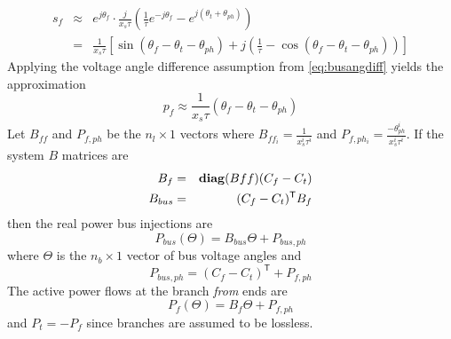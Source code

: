 \begin{eqnarray}
s_f& \approx& e^{j\theta_f} \cdot \frac{j}{x_s\tau}
(\frac{1}{\tau}e^{-j\theta_f} - e^{j(\theta_t + \theta_{ph})})\\
& =& \frac{1}{x_s\tau} \left[ \sin(\theta_f-\theta_t-\theta_{ph}) +
j\left( \frac{1}{\tau} - \cos(\theta_f-\theta_t-\theta_{ph}) \right) \right]
\end{eqnarray}
Applying the voltage angle difference assumption from \ref{eq:busangdiff} yields
the approximation
\begin{equation}
p_f \approx \frac{1}{x_s\tau}(\theta_f-\theta_t-\theta_{ph})
\end{equation}
Let $B_{ff}$ and $P_{f,ph}$ be the $n_l \times 1$ vectors where
$B_{ff_i} = \frac{1}{x_s^i\tau^i}$ and $P_{f,ph_i} =
\frac{-\theta_{ph}^i}{x_s^i\tau^i}$.  If the system $B$ matrices are
\begin{eqnarray}
B_f& =& \mathop{\mathbf{diag}}(Bff)(C_f-C_t)\\
B_{bus}& = &(C_f-C_t)^\mathsf{T}B_f
\end{eqnarray}
then the real power bus injections are
\begin{equation}
\label{eq:bbus}
P_{bus}(\Theta) = B_{bus}\Theta + P_{bus,ph}
\end{equation}
where $\Theta$ is the $n_b \times 1$ vector of bus voltage angles and
\begin{equation}
P_{bus,ph} = (C_f-C_t)^\mathsf{T} + P_{f,ph}
\end{equation}
The active power flows at the branch \textit{from} ends are
\begin{equation}
\label{eq:pf_loss}
P_f(\Theta) = B_f\Theta + P_{f,ph}
\end{equation}
and $P_t = -P_f$ since branches are assumed to be lossless.

